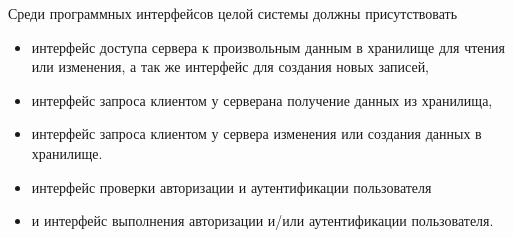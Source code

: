 Среди программных интерфейсов целой системы должны присутствовать \begin{itemize}
    \item интерфейс доступа сервера к произвольным данным в хранилище для чтения или изменения, а так же интерфейс для создания новых записей,
    \item интерфейс запроса клиентом у серверана получение данных из хранилища,
    \item интерфейс запроса клиентом у сервера изменения или создания данных в хранилище.
    \item интерфейс проверки авторизации и аутентификации пользователя
    \item и интерфейс выполнения авторизации и/или аутентификации пользователя.


\end{itemize}



